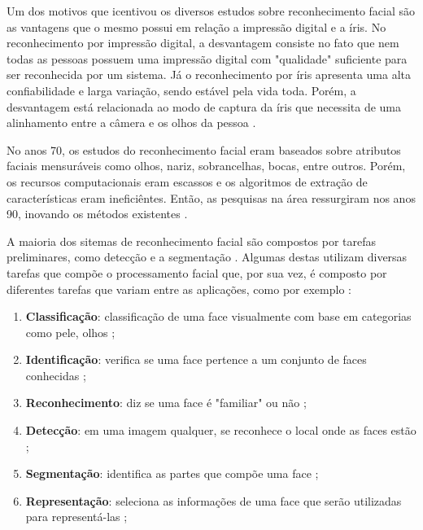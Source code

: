 Um dos motivos que icentivou os diversos estudos sobre reconhecimento facial são as vantagens que o mesmo possui em relação a impressão digital e a íris.  No reconhecimento por impressão digital, a desvantagem consiste no fato que nem todas as pessoas possuem uma impressão digital com "qualidade" suficiente para ser reconhecida por um sistema. Já o reconhecimento por íris apresenta uma alta confiabilidade e larga variação, sendo estável pela vida toda. Porém, a desvantagem está relacionada ao modo de captura da íris que necessita de uma alinhamento entre a câmera e os olhos da pessoa \cite{saocarlos}.

No anos 70, os estudos do reconhecimento facial eram baseados sobre atributos faciais mensuráveis como olhos, nariz, sobrancelhas, bocas, entre outros. Porém, os recursos computacionais eram escassos e os algoritmos de extração de características eram ineficiêntes. Então, as pesquisas na área ressurgiram nos anos 90, inovando os métodos existentes \cite{Hon98}\cite{saocarlos}.

A maioria dos sitemas de reconhecimento facial são compostos por tarefas preliminares, como detecção e a segmentação \cite{Sun98}. 
Algumas destas utilizam diversas tarefas que compõe o processamento facial que, por sua vez, é composto por diferentes tarefas que variam entre as aplicações, como por exemplo \cite{saocarlos}:
	\begin{enumerate}
		\item \textbf{Classificação}: classificação de uma face visualmente com base em categorias como pele, olhos \cite{Abd95};
		\item \textbf{Identificação}: verifica se uma face pertence a um conjunto de faces conhecidas \cite{Cell99};
		\item \textbf{Reconhecimento}: diz se uma face é "familiar" ou não \cite{Abd95};
		\item \textbf{Detecção}: em uma imagem qualquer, se reconhece o local onde as faces estão \cite{Cell99};
		\item \textbf{Segmentação}: identifica as partes que compõe uma face \cite{Cell99};
		\item \textbf{Representação}: seleciona as informações de uma face que serão utilizadas para representá-las \cite{Cell99};
	\end{enumerate}






